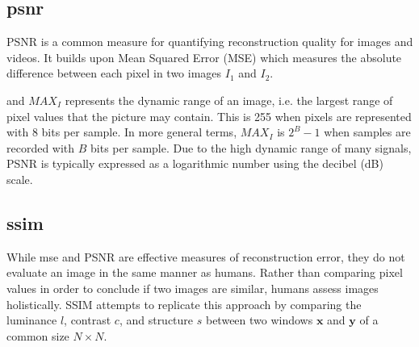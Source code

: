 
\subsection[PSNR]{\acrfull{psnr}} \label{sec:psnr}
PSNR is a common measure for quantifying reconstruction quality for images and videos. It builds upon Mean Squared Error (MSE) which measures the absolute difference between each pixel in two images $I_1$ and $I_2$.



and $MAX_I$ represents the dynamic range of an image, i.e. the largest range of pixel values that the picture may contain. This is 255 when pixels are represented with 8 bits per sample. In more general terms, $MAX_I$ is $2^B-1$ when samples are recorded with $B$ bits per sample. Due to the high dynamic range of many signals, PSNR is typically expressed as a logarithmic number using the decibel (dB) scale.


\subsection[SSIM]{\acrfull{ssim}}
While \acrfull{mse} and PSNR are effective measures of reconstruction error, they do not evaluate an image in the same manner as humans. Rather than comparing pixel values in order to conclude if two images are similar, humans assess images holistically. SSIM attempts to replicate this approach by comparing the luminance $l$, contrast $c$, and structure $s$ between two windows $\pmb{x}$ and $\pmb{y}$ of a common size $N \times N$.


